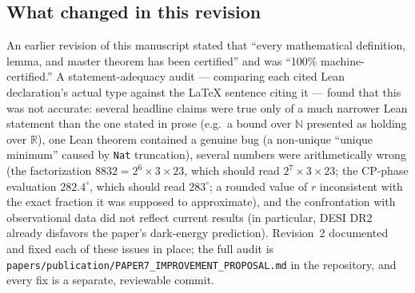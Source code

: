 \documentclass[11pt,a4paper]{article}
\theoremstyle{remark}
\begin{document}
\subsection{What changed in this revision}
\label{sec:changelog}
An earlier revision of this manuscript stated that ``every mathematical definition, lemma, and
master theorem has been certified'' and was ``100\% machine-certified.'' A statement-adequacy audit
--- comparing each cited Lean declaration's actual type against the LaTeX sentence citing it ---
found that this was not accurate: several headline claims were true only of a much narrower Lean
statement than the one stated in prose (e.g.\ a bound over $\mathbb{N}$ presented as holding over
$\mathbb{R}$), one Lean theorem contained a genuine bug (a non-unique ``unique minimum'' caused by
\texttt{Nat} truncation), several numbers were arithmetically wrong (the factorization
$8832=2^6\times 3\times 23$, which should read $2^7\times 3\times 23$; the CP-phase evaluation
$282.4^\circ$, which should read $283^\circ$; a rounded value of $r$ inconsistent with the exact
fraction it was supposed to approximate), and the confrontation with observational data did not
reflect current results (in particular, DESI DR2 already disfavors the paper's dark-energy
prediction). Revision~2 documented and fixed each of these issues in place; the full audit is
\texttt{papers/publication/PAPER7\_IMPROVEMENT\_PROPOSAL.md} in the repository, and every fix is a
separate, reviewable commit.
\end{document}
